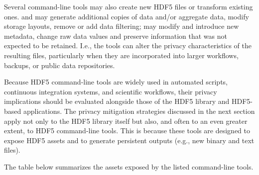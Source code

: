 \documentclass[../main.tex]{subfiles}
\begin{document}
Several command-line tools may also create new HDF5 files or transform existing ones. 
 and  may generate additional copies of data and/or aggregate data, modify 
storage layouts, remove or add data filtering;  
may modify and introduce new metadata, change raw data values and preserve information 
that was not expected to be retained. I.e., the tools can alter the privacy 
characteristics of the resulting files, particularly when they are incorporated into 
larger workflows, backups, or public data repositories.

Because HDF5 command-line tools are widely used in automated scripts, continuous 
integration systems, and scientific workflows, their privacy implications should be 
evaluated alongside those of the HDF5 library and HDF5-based applications. 
The privacy mitigation strategies discussed in the next section apply not only to the 
HDF5 library itself but also, and often to an even greater extent, to HDF5 command-line tools. 
This is because these tools are designed to expose HDF5 assets and to generate 
persistent outputs (e.g., new binary and text files). 

The table below summarizes the assets exposed by the listed command-line tools.

\begingroup
\small
\setlength{\tabcolsep}{3pt}
\renewcommand{\arraystretch}{1.15}

\setlength{\LTleft}{-0.9in}
\setlength{\LTright}{-0.9in}
\end{document}
